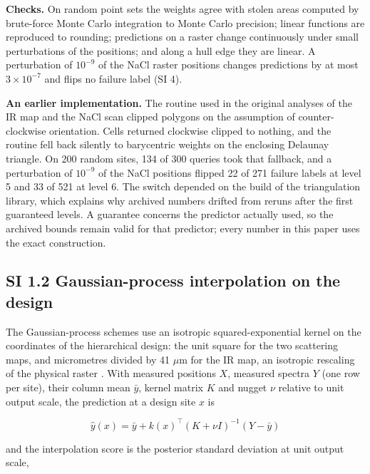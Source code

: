 \documentclass{iopjournal}
\begin{document}
\textbf{Checks.} On random point sets the weights agree with stolen areas computed by brute-force Monte Carlo integration to Monte Carlo precision; linear functions are reproduced to rounding; predictions on a raster change continuously under small perturbations of the positions; and along a hull edge they are linear. A perturbation of \(10^{-9}\) of the NaCl raster positions changes predictions by at most \(3 \times 10^{-7}\) and flips no failure label (SI 4).

\textbf{An earlier implementation.} The routine used in the original analyses of the IR map and the NaCl scan clipped polygons on the assumption of counter-clockwise orientation. Cells returned clockwise clipped to nothing, and the routine fell back silently to barycentric weights on the enclosing Delaunay triangle. On 200 random sites, 134 of 300 queries took that fallback, and a perturbation of \(10^{-9}\) of the NaCl positions flipped 22 of 271 failure labels at level 5 and 33 of 521 at level 6. The switch depended on the build of the triangulation library, which explains why archived numbers drifted from reruns after the first guaranteed levels. A guarantee concerns the predictor actually used, so the archived bounds remain valid for that predictor; every number in this paper uses the exact construction.

\hypertarget{si-1.2-gaussian-process-interpolation-on-the-design}{%
\subsection*{SI 1.2 Gaussian-process interpolation on the design}\label{si-1.2-gaussian-process-interpolation-on-the-design}}

The Gaussian-process schemes use an isotropic squared-exponential kernel on the coordinates of the hierarchical design: the unit square for the two scattering maps, and micrometres divided by 41 \ensuremath{\mu}m for the IR map, an isotropic rescaling of the physical raster \cite{RasmussenWilliams2006}. With measured positions \(X\), measured spectra \(Y\) (one row per site), their column mean \(\bar y\), kernel matrix \(K\) and nugget \(\nu\) relative to unit output scale, the prediction at a design site \(x\) is

\[
\hat y(x) = \bar y + k(x)^\top (K + \nu I)^{-1} (Y - \bar y)
\]

and the interpolation score is the posterior standard deviation at unit output scale,
\end{document}
